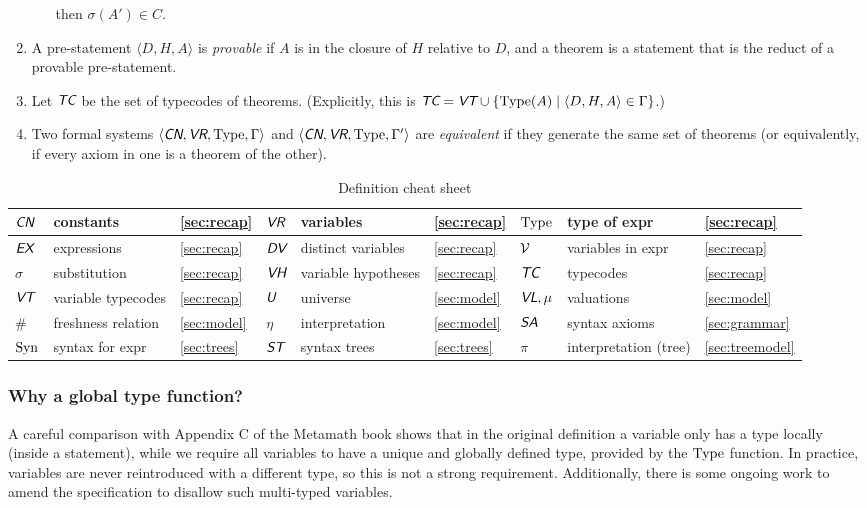 \documentclass[runningheads,a4paper]{llncs}
\newcommand{\cn}{\textit{\textsf{CN}}} %
\newcommand{\vr}{\textit{\textsf{VR}}} %
\newcommand{\ex}{\textit{\textsf{EX}}} %
\newcommand{\dv}{\textit{\textsf{DV}}} %
\newcommand{\vh}{\textit{\textsf{VH}}} %
\newcommand{\tc}{\textit{\textsf{TC}}} %
\newcommand{\vt}{\textit{\textsf{VT}}} %
\newcommand{\vl}{\textit{\textsf{VL}}} %
\newcommand{\uv}{\textit{\textsf{U}}} %
\newcommand{\sa}{\textit{\textsf{SA}}} %
\newcommand{\st}{\textit{\textsf{ST}}} %
\newcommand{\ang}[1]{\langle#1\rangle}
\newcommand{\type}{{\rm Type}}
\newcommand{\syn}{{\rm Syn}}
\newcommand{\fresh}{\mathbin{\#}}
\begin{document}
\begin{enumerate}
\begin{itemize}
\begin{itemize}
    \end{itemize}
    then $\sigma(A')\in C$.
  \end{itemize}
  \item A pre-statement $\ang{D,H,A}$ is {\em provable} if $A$ is in the closure of $H$ relative to $D$, and a theorem is a statement that is the reduct of a provable pre-statement.
  \item Let $\tc$ be the set of typecodes of theorems. (Explicitly, this is $\tc=\vt\cup\{\type(A)\mid\ang{D,H,A}\in\Gamma\}$.)
  \item Two formal systems $\ang{\cn,\vr,\type,\Gamma}$ and $\ang{\cn,\vr,\type,\Gamma'}$ are {\em equivalent} if they generate the same set of theorems (or equivalently, if every axiom in one is a theorem of the other).
\end{enumerate}
\begin{table}[t]
  \centering
  \begin{tabular}{|lll|lll|lll|} \hline
    $\cn$ & constants & \autoref{sec:recap} &
    $\vr$ & variables & \autoref{sec:recap} &
    $\type$ & type of expr & \autoref{sec:recap} \\ \hline
    $\ex$ & expressions & \autoref{sec:recap} &
    $\dv$ & distinct variables & \autoref{sec:recap} &
    $\cal V$ & variables in expr & \autoref{sec:recap} \\ \hline
    $\sigma$ & substitution & \autoref{sec:recap} &
    $\vh$ & variable hypotheses & \autoref{sec:recap} &
    $\tc$ & typecodes & \autoref{sec:recap} \\ \hline
    $\vt$ & variable typecodes & \autoref{sec:recap} &
    $\uv$ & universe & \autoref{sec:model} &
    $\vl,\mu$ & valuations & \autoref{sec:model} \\ \hline
    $\fresh$ & freshness relation & \autoref{sec:model} &
    $\eta$ & interpretation & \autoref{sec:model} &
    $\sa$ & syntax axioms & \autoref{sec:grammar} \\ \hline
    $\syn$ & syntax for expr & \autoref{sec:trees} &
    $\st$ & syntax trees & \autoref{sec:trees} &
    $\pi$ & interpretation (tree) & \autoref{sec:treemodel} \\ \hline
  \end{tabular}
  \vspace*{0pt}
  \caption{Definition cheat sheet}
\end{table}

\subsubsection{Why a global type function?}
A careful comparison with Appendix C of the Metamath book \cite{metamath} shows that in the original definition a variable only has a type locally (inside a statement), while we require all variables to have a unique and globally defined type, provided by the $\type$ function. In practice, variables are never reintroduced with a different type, so this is not a strong requirement. Additionally, there is some ongoing work to amend the specification to disallow such multi-typed variables.
\end{document}
